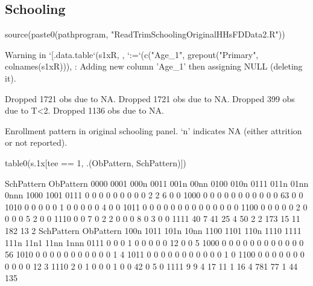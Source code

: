 \subsection{Schooling}



\begin{Schunk}
\begin{Sinput}
source(paste0(pathprogram, "ReadTrimSchoolingOriginalHHsFDData2.R"))
\end{Sinput}
\begin{Soutput}
Warning in `[.data.table`(s1xR, , `:=`(c("Age_1", grepout("Primary", colnames(s1xR))), : Adding new column 'Age_1' then assigning NULL (deleting it).
\end{Soutput}
\begin{Soutput}
Dropped 1721 obs due to NA.
Dropped 1721 obs due to NA.
Dropped 399 obs due to T<2.
Dropped 1136 obs due to NA.
\end{Soutput}
\end{Schunk}
Enrollment pattern in original schooling panel. `n' indicates NA (either attrition or not reported).
\begin{Schunk}
\begin{Sinput}
table0(s.1x[tee == 1, .(ObPattern, SchPattern)])
\end{Sinput}
\begin{Soutput}
         SchPattern
ObPattern 0000 0001 000n 0011 001n 00nn 0100 010n 0111 011n 01nn 0nnn 1000 1001
     0111    0    0    0    0    0    0    0    0    0    2    2    6    0    0
     1000    0    0    0    0    0    0    0    0    0    0    0   63    0    0
     1010    0    0    0    0    0    1    0    0    0    0    0    4    0    0
     1011    0    0    0    0    0    0    0    0    0    0    0    0    0    0
     1100    0    0    0    0    0    2    0    0    0    0    5    2    0    0
     1110    0    0    7    0    2    2    0    0    0    8    0    3    0    0
     1111   40    7   41   25    4   50    2    2  173   15   11  182   13    2
         SchPattern
ObPattern 100n 1011 101n 10nn 1100 1101 110n 1110 1111 111n 11n1 11nn 1nnn
     0111    0    0    0    1    0    0    0    0    0   12    0    0    5
     1000    0    0    0    0    0    0    0    0    0    0    0    0   56
     1010    0    0    0    0    0    0    0    0    0    0    0    1    4
     1011    0    0    0    0    0    0    0    0    0    0    0    1    0
     1100    0    0    0    0    0    0    0    0    0    0    0   12    3
     1110    2    0    1    0    0    0    1    0    0   42    0    5    0
     1111    9    9    4   17   11    1   16    4  781   77    1   44  135
\end{Soutput}
\end{Schunk}
